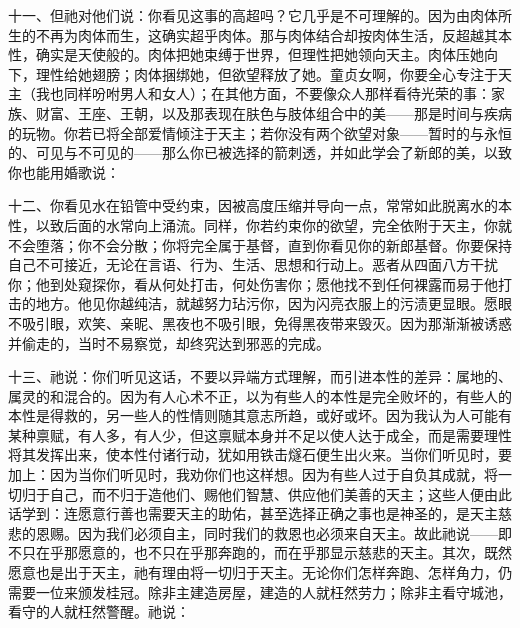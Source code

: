 十一、但祂对他们说：你看见这事的高超吗？它几乎是不可理解的。因为由肉体所生的不再为肉体而生，这确实超乎肉体。那与肉体结合却按肉体生活，反超越其本性，确实是天使般的。肉体把她束缚于世界，但理性把她领向天主。肉体压她向下，理性给她翅膀；肉体捆绑她，但欲望释放了她。童贞女啊，你要全心专注于天主（我也同样吩咐男人和女人）；在其他方面，不要像众人那样看待光荣的事：家族、财富、王座、王朝，以及那表现在肤色与肢体组合中的美——那是时间与疾病的玩物。你若已将全部爱情倾注于天主；若你没有两个欲望对象——暂时的与永恒的、可见与不可见的——那么你已被选择的箭刺透，并如此学会了新郎的美，以致你也能用婚歌说：\par

十二、你看见水在铅管中受约束，因被高度压缩并导向一点，常常如此脱离水的本性，以致后面的水常向上涌流。同样，你若约束你的欲望，完全依附于天主，你就不会堕落；你不会分散；你将完全属于基督，直到你看见你的新郎基督。你要保持自己不可接近，无论在言语、行为、生活、思想和行动上。恶者从四面八方干扰你；他到处窥探你，看从何处打击，何处伤害你；愿他找不到任何裸露而易于他打击的地方。他见你越纯洁，就越努力玷污你，因为闪亮衣服上的污渍更显眼。愿眼不吸引眼，欢笑、亲昵、黑夜也不吸引眼，免得黑夜带来毁灭。因为那渐渐被诱惑并偷走的，当时不易察觉，却终究达到邪恶的完成。\par

十三、祂说：你们听见这话，不要以异端方式理解，而引进本性的差异：属地的、属灵的和混合的。因为有人心术不正，以为有些人的本性是完全败坏的，有些人的本性是得救的，另一些人的性情则随其意志所趋，或好或坏。因为我认为人可能有某种禀赋，有人多，有人少，但这禀赋本身并不足以使人达于成全，而是需要理性将其发挥出来，使本性付诸行动，犹如用铁击燧石便生出火来。当你们听见时，要加上：因为当你们听见时，我劝你们也这样想。因为有些人过于自负其成就，将一切归于自己，而不归于造他们、赐他们智慧、供应他们美善的天主；这些人便由此话学到：连愿意行善也需要天主的助佑，甚至选择正确之事也是神圣的，是天主慈悲的恩赐。因为我们必须自主，同时我们的救恩也必须来自天主。故此祂说——即不只在乎那愿意的，也不只在乎那奔跑的，而在乎那显示慈悲的天主。其次，既然愿意也是出于天主，祂有理由将一切归于天主。无论你们怎样奔跑、怎样角力，仍需要一位来颁发桂冠。除非主建造房屋，建造的人就枉然劳力；除非主看守城池，看守的人就枉然警醒。祂说：\par

